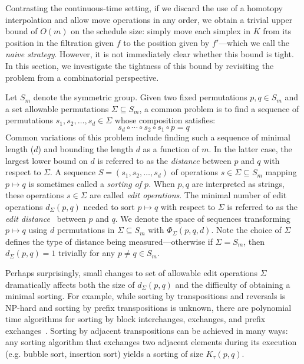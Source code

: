 \documentclass[sn-mathphys]{sn-jnl}
\begin{document}
Contrasting the continuous-time setting, if we discard the use of a homotopy interpolation and allow move operations in any order, we obtain a trivial upper bound of $O(m)$ on the schedule size:  simply move each simplex in $K$ from  its position in the filtration given $f$ to the position given by $f'$---which we call the \emph{naive strategy}. However, it is not immediately clear whether this bound is tight. In this section, we investigate the tightness of this bound by revisiting the problem from a combinatorial perspective. 


Let $S_m$ denote the symmetric group. Given two fixed permutations $p, q \in S_m$ and a set allowable permutations $\Sigma \subseteq S_m$,  a common  problem is to find a sequence of permutations $s_1, s_2, \dots, s_d \in \Sigma$ whose composition satisfies:
	\begin{equation}\label{eq:sorting}
		s_d \circ \cdots \circ s_2 \circ s_1 \circ p = q
	\end{equation}
Common variations of this problem include finding such a sequence of minimal length ($d$) and bounding the length $d$ as a function of $m$. In the latter case, the largest  lower bound on $d$ is referred to as the \emph{distance} between $p$ and $q$ with respect to $\Sigma$. 
A sequence $S = (s_1, s_2, \dots, s_d)$ of operations $s \in \Sigma \subseteq S_m$ mapping $p \mapsto q$ is sometimes called a \emph{sorting of $p$}. 
When $p, q$ are interpreted as strings, these operations $s \in \Sigma$ are called \emph{edit operations}. The minimal number of edit operations $d_\Sigma(p, q)$ needed to sort $p \mapsto q$ with respect to $\Sigma$ is referred to as the \emph{edit distance}~\cite{bergroth2000survey} between $p$ and $q$.
We denote the space of sequences transforming $p \mapsto q$ using $d$ permutations in $\Sigma \subseteq S_m$ with $\Phi_\Sigma(p,q,d)$.
Note the choice of $\Sigma$ defines the type of distance being measured---otherwise if $\Sigma = S_m$, then $d_\Sigma(p, q) = 1$ trivially for any $p\neq  q \in S_m$.

Perhaps surprisingly, small changes to set of allowable edit operations $\Sigma$ dramatically affects both the size of $d_\Sigma(p,q)$ and the difficulty of obtaining a minimal sorting. 
For example, while sorting by transpositions and reversals is NP-hard and sorting by prefix  transpositions is unknown, there are polynomial time algorithms for sorting by block interchanges, exchanges, and prefix exchanges~\cite{labarre2013lower}. Sorting by adjacent transpositions can be achieved in many ways: any sorting algorithm that exchanges two adjacent elements during its execution (e.g. bubble sort, insertion sort) yields a sorting of size $K_\tau(p, q)$.  
\end{document}
